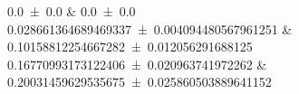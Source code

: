 \num{0.0 \pm 0.0}		&		\num{0.0 \pm 0.0}	 \\ 
\num{0.028661364689469337 \pm 0.004094480567961251}		&		\num{0.10158812254667282 \pm 0.012056291688125}	 \\ 
\num{0.16770993173122406 \pm 0.020963741972262}		&		\num{0.20031459629535675 \pm 0.025860503889641152}	 \\ 
